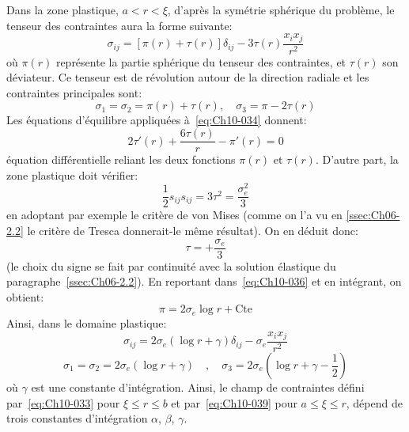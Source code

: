 Dans la zone plastique, $a<r<\xi$, d'après la symétrie sphérique du problème, le tenseur des contraintes aura la forme suivante: 
\begin{equation}
    \sigma_{ij} = \left[ \pi(r) + \tau(r) \right] \delta_{ij} - 3 \tau(r) \frac{x_ix_j}{r^2}
    \label{eq:Ch10-034}
\end{equation}
où $\pi(r)$ représente la partie sphérique du tenseur des contraintes, et $\tau(r)$ son déviateur.
Ce tenseur est de révolution autour de la direction radiale et les contraintes principales sont: 
\begin{equation}
    \sigma_1 = \sigma_2 = \pi(r) + \tau(r) ,\quad \sigma_3 = \pi - 2\tau(r)
    \label{eq:Ch10-035}
\end{equation}
Les équations d'équilibre appliquées à~\eqref{eq:Ch10-034} donnent: 
\begin{equation}
    2\tau'(r) + \frac{6\tau(r)}{r} - \pi'(r) = 0
    \label{eq:Ch10-036}
\end{equation}
équation différentielle reliant les deux fonctions $\pi(r)$ et $\tau(r)$. 
D'autre part, la zone plastique doit vérifier: 
\[
\frac{1}{2} s_{ij} s_{ij} = 3 \tau^2 = \frac{\sigma_e^2}{3}
\]
en adoptant par exemple le critère de von Mises (comme on l'a vu en \ref{ssec:Ch06-2.2} le critère de Tresca donnerait-le même résultat).
On en déduit donc: 
\begin{equation}
    \tau = + \frac{\sigma_e}{3}
    \label{eq:Ch10-037}
\end{equation}
(le choix du signe se fait par continuité avec la solution élastique du paragraphe~\ref{ssec:Ch06-2.2}).
En reportant dans~\eqref{eq:Ch10-036} et en intégrant, on obtient: 
\begin{equation}
    \pi = 2 \sigma_e \log r + \text{Cte}
    \label{eq:Ch10-038}
\end{equation}
Ainsi, dans le domaine plastique: 
\begin{equation}
   \sigma_{ij} = 2 \sigma_e \left( \log r + \gamma \right) \delta_{ij} - \sigma_e \frac{x_ix_j}{r^2}
   \label{eq:Ch10-039}
\end{equation}
\begin{equation}
   \sigma_1 = \sigma_2 = 2 \sigma_e \left( \log r + \gamma \right) \quad,\quad \sigma_3 = 2 \sigma_e \left( \log r + \gamma - \frac{1}{2} \right)
    \label{eq:Ch10-040}
\end{equation}
où $\gamma$ est une constante d'intégration.
Ainsi, le champ de contraintes défini par~\eqref{eq:Ch10-033} pour $\xi \leq r \leq b$ et par~\eqref{eq:Ch10-039} pour $a \leq \xi \leq r$, dépend de trois constantes d'intégration $\alpha$, $\beta$, $\gamma$.
